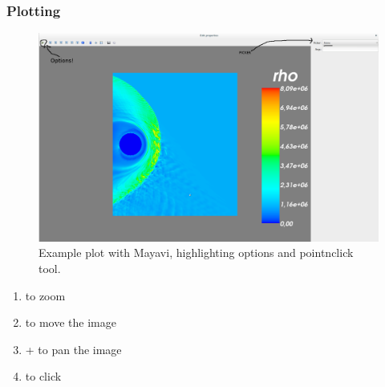 \documentclass{beamer}
\begin{document}
\begin{frame}[fragile]
 \frametitle{Plotting}
 \begin{center}
 
 \begin{figure}
  \centering
  \includegraphics[height=0.2\textheight]{../images/none.png}
  \caption{\tiny{Example plot with Mayavi, highlighting options and pointnclick tool.}}
  \label{fig:mayavi_example2}
 \end{figure}
 
 \begin{enumerate}
  \item {} to zoom
  \item {} to move the image
  \item {} +  to pan the image
  \item {} to click
 \end{enumerate}

 \end{center}
 
\end{frame}
\end{document}
